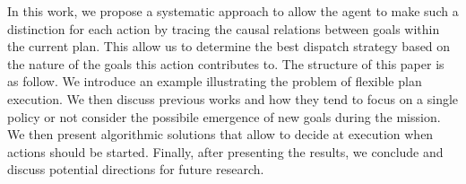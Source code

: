In this work, we propose a systematic approach to allow the agent to
make such a distinction for each action by tracing the causal relations
between goals within the current plan.  This allow us to determine the
best dispatch strategy based on the nature of the goals this action
contributes to. The structure of this paper is as follow. We introduce 
an example illustrating the problem of flexible plan execution. We then discuss
previous works and how they tend to focus on a single policy or not
consider the possibile emergence of new goals during the mission. We
then present algorithmic solutions that allow to decide at execution
when actions should be started. Finally, after presenting the results,
we conclude and discuss potential directions for future research.






